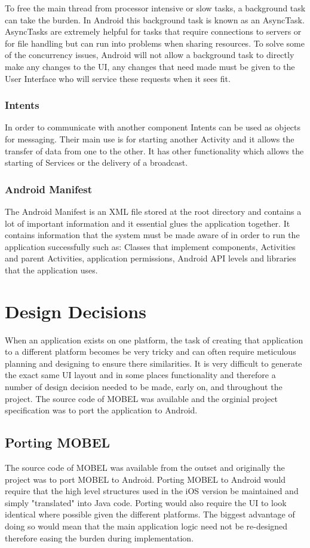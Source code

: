 \documentclass{l4proj}
\begin{document}
To free the main thread from processor intensive or slow tasks, a background task can take the burden. In Android this background task is known as an AsyncTask. AsyncTasks are extremely helpful for tasks that require connections to servers or for file handling but can run into problems when sharing resources.  To solve some of the concurrency issues, Android will not allow a background task to directly make any changes to the UI, any changes that need made must be given to the User Interface who will service these requests when it sees fit.

\subsubsection{Intents}
In order to communicate with another component Intents can be used as objects for messaging.  Their main use is for starting another Activity and it allows the transfer of data from one to the other. It has other functionality which allows the starting of Services or the delivery of a broadcast.

\subsubsection{Android Manifest}
The Android Manifest is an XML file stored at the root directory and contains a lot of important information and it essential glues the application together. It contains information that the system must be made aware of in order to run the application successfully such as: Classes that implement components, Activities and parent Activities, application permissions, Android API levels and libraries that the application uses. 

\section{Design Decisions}
When an application exists on one platform, the task of creating that application to a different platform becomes be very tricky and can often require meticulous planning and designing to ensure there similarities. It is very difficult to generate the exact same UI layout and in some places functionality and therefore a number of design decision needed to be made, early on, and throughout the project.  The source code of MOBEL was available and the orginial project specification was to port the application to Android.  

\subsection{Porting MOBEL} 
The source code of MOBEL was available from the outset and originally the project was to port MOBEL to Android.  Porting MOBEL to Android would require that the high level structures used in the iOS version be maintained and simply "translated" into Java code.  Porting would also require the UI to look identical where possible given the different platforms. The biggest advantage of doing so would mean that the main application logic need not be re-designed therefore easing the burden during implementation. 
\end{document}
